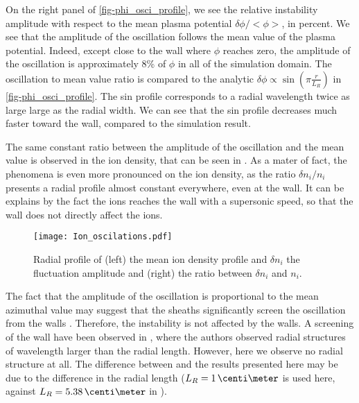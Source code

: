   On the right panel of \cref{fig-phi_osci_profile}, we see the relative instability amplitude with respect to the mean plasma potential $\delta\phi / <\phi>$, in percent.
  We see that the amplitude of the oscillation follows the mean value of the plasma potential.
  Indeed, except close to the wall where $\phi$ reaches zero, the amplitude of the oscillation is approximately 8\% of $\phi$ in all of the simulation domain.
  The oscillation to mean value ratio is compared to the analytic $\delta \phi \propto \sin( \pi \frac{r}{L_R})$ in \cref{fig-phi_osci_profile}.
  The sin profile corresponds to a radial wavelength twice as large large as the radial width.
  We can see that the sin profile decreases much faster toward the wall, compared to the simulation result.
  
  

  The same constant ratio between the amplitude of the oscillation and the mean value is observed in the ion density, that can be seen in .
  As a mater of fact, the phenomena is even more pronounced on the ion density, as the ratio $\delta n_i / n_i$ presents a radial profile almost constant everywhere, even at the wall.
  It can be explains by the fact the ions reaches the wall with a supersonic speed, so that the wall does not directly affect the ions.
  
  
  \begin{figure}[!hbt]
    \centering
    \texttt{[image: Ion\_oscilations.pdf]}
    \caption{Radial profile of (left) the mean ion density profile and $\delta n_i$ the fluctuation amplitude and (right) the ratio between $\delta n_i$ and $n_i$.}
    \label{fig-ion_oscilation}
  \end{figure}
  
  \vspace{1em}
  The fact that the amplitude of the oscillation is proportional to the mean azimuthal value may suggest that the sheaths significantly  screen  the oscillation from the walls .
  Therefore, the instability is not affected by the walls.
  A screening of the wall have been observed in \citet{janhunen2018}, where the authors observed radial structures of wavelength larger than the radial length.
  However, here we observe no radial structure at all.
  The difference between  \citet{janhunen2018} and the results presented here may be due to the difference in the radial length ($L_R =1 \,\centi\meter$ is used here, against $L_R = 5.38\,\centi\meter$ in \citet{janhunen2018} ).
  
